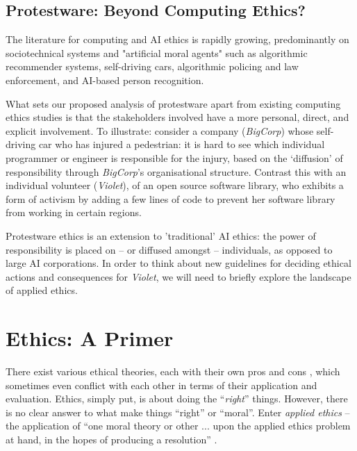 \documentclass[journal,twocolumn]{IEEEtran}
\begin{document}



\subsection{Protestware: Beyond Computing Ethics?}
The literature for computing and AI ethics is rapidly growing, predominantly on sociotechnical systems and "artificial moral agents" \cite{Zoshak2021} such as algorithmic recommender systems, self-driving cars, algorithmic policing and law enforcement, and AI-based person recognition.

What sets our proposed analysis of protestware apart from existing computing ethics studies is that the stakeholders involved have a more personal, direct, and explicit involvement. To illustrate: consider a company (\textit{BigCorp}) whose self-driving car who has injured a pedestrian: it is hard to see which individual programmer or engineer is responsible for the injury, based on the `diffusion' of responsibility through \textit{BigCorp}'s organisational structure. Contrast this with an individual volunteer (\textit{Violet}), of an open source software library, who exhibits a form of activism by adding a few lines of code to prevent her software library from working in certain regions. 

Protestware ethics is an extension to 'traditional' AI ethics: the power of responsibility is placed on -- or diffused amongst -- individuals, as opposed to large AI corporations.
In order to think about new guidelines for deciding ethical actions and consequences for \textit{Violet}, we will need to briefly explore the landscape of applied ethics.

\section{Ethics: A Primer}

\label{sec:ethics}
There exist various ethical theories, each with their own pros and cons \cite{Rachels2015}, which sometimes even conflict with each other in terms of their application and evaluation. 
Ethics, simply put, is about doing the ``\textit{right}'' things. However, there is no clear answer to what make things ``right'' or ``moral''. Enter \textit{applied ethics} -- the application of ``one moral theory or other ... upon the applied ethics problem at hand, in the hopes of producing a resolution'' \cite{sep-theory-bioethics}. 
\end{document}

